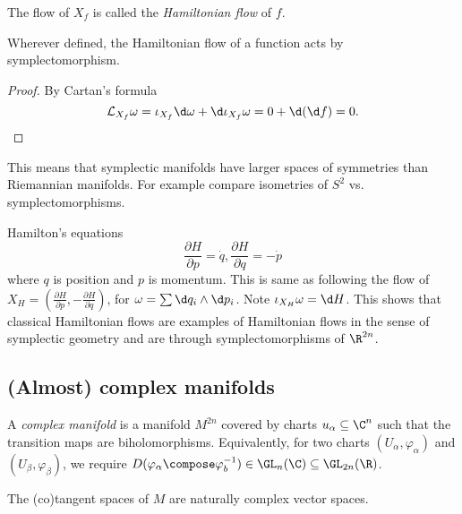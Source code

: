 \documentclass[a4paper]{article}
\newcommand{\w}{\wedge} %
\begin{document}
\begin{definition}
  The flow of \(X_f\) is called the \emph{Hamiltonian flow} of \(f\).
\end{definition}

\begin{proposition}
  Wherever defined, the Hamiltonian flow of a function acts by symplectomorphism.
\end{proposition}

\begin{proof}
  By Cartan's formula
  \[
    \mathcal L_{X_f} \omega = \iota_{X_f} \d \omega + \d \iota_{X_f} \omega
    = 0 + \d (\d f) = 0.
  \]
\end{proof}

\begin{remark}
  This means that symplectic manifolds have larger spaces of symmetries than Riemannian manifolds. For example compare isometries of \(S^2\) vs. symplectomorphisms.
\end{remark}

\begin{eg}
  Hamilton's equations
  \[
    \frac{\partial H}{\partial p} = \dot q, \frac{\partial H}{\partial q} = - \dot p
  \]
  where \(q\) is position and \(p\) is momentum. This is same as following the flow of \(X_H = (\frac{\partial H}{\partial p}, - \frac{\partial H}{\partial q})\), for \(\omega = \sum \d q_i \w \d p_i\). Note \(\iota_{X_H} \omega = \d H\). This shows that classical Hamiltonian flows are examples of Hamiltonian flows in the sense of symplectic geometry and are through symplectomorphisms of \(\R^{2n}\).
\end{eg}

\subsection{(Almost) complex manifolds}

\begin{definition}
  A \emph{complex manifold} is a manifold \(M^{2n}\) covered by charts \(u_\alpha \subseteq \C^n\) such that the transition maps are biholomorphisms. Equivalently, for two charts \((U_\alpha, \varphi_\alpha)\) and \((U_\beta, \varphi_\beta)\), we require \(D(\varphi_\alpha \compose \varphi_b^{-1}) \in \GL_n(\C) \subseteq \GL_{2n}(\R)\).
\end{definition}

The (co)tangent spaces of \(M\) are naturally complex vector spaces.
\end{document}
